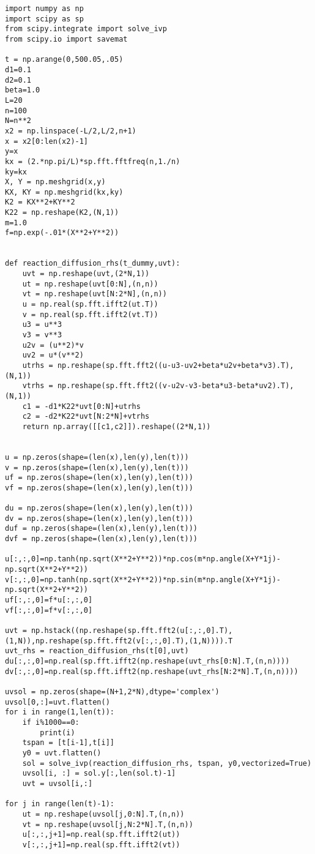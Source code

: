 \documentclass[12pt]{article}
\begin{document}
\begin{verbatim}
import numpy as np
import scipy as sp
from scipy.integrate import solve_ivp
from scipy.io import savemat

t = np.arange(0,500.05,.05)
d1=0.1
d2=0.1
beta=1.0
L=20
n=100
N=n**2
x2 = np.linspace(-L/2,L/2,n+1)
x = x2[0:len(x2)-1]
y=x
kx = (2.*np.pi/L)*sp.fft.fftfreq(n,1./n)
ky=kx
X, Y = np.meshgrid(x,y)
KX, KY = np.meshgrid(kx,ky)
K2 = KX**2+KY**2
K22 = np.reshape(K2,(N,1))
m=1.0
f=np.exp(-.01*(X**2+Y**2))


def reaction_diffusion_rhs(t_dummy,uvt):
    uvt = np.reshape(uvt,(2*N,1))
    ut = np.reshape(uvt[0:N],(n,n))
    vt = np.reshape(uvt[N:2*N],(n,n))
    u = np.real(sp.fft.ifft2(ut.T))
    v = np.real(sp.fft.ifft2(vt.T))
    u3 = u**3
    v3 = v**3
    u2v = (u**2)*v
    uv2 = u*(v**2)
    utrhs = np.reshape(sp.fft.fft2((u-u3-uv2+beta*u2v+beta*v3).T),(N,1))
    vtrhs = np.reshape(sp.fft.fft2((v-u2v-v3-beta*u3-beta*uv2).T),(N,1))
    c1 = -d1*K22*uvt[0:N]+utrhs
    c2 = -d2*K22*uvt[N:2*N]+vtrhs
    return np.array([[c1,c2]]).reshape((2*N,1))


u = np.zeros(shape=(len(x),len(y),len(t)))
v = np.zeros(shape=(len(x),len(y),len(t)))
uf = np.zeros(shape=(len(x),len(y),len(t)))
vf = np.zeros(shape=(len(x),len(y),len(t)))

du = np.zeros(shape=(len(x),len(y),len(t)))
dv = np.zeros(shape=(len(x),len(y),len(t)))
duf = np.zeros(shape=(len(x),len(y),len(t)))
dvf = np.zeros(shape=(len(x),len(y),len(t)))

u[:,:,0]=np.tanh(np.sqrt(X**2+Y**2))*np.cos(m*np.angle(X+Y*1j)-np.sqrt(X**2+Y**2))
v[:,:,0]=np.tanh(np.sqrt(X**2+Y**2))*np.sin(m*np.angle(X+Y*1j)-np.sqrt(X**2+Y**2))
uf[:,:,0]=f*u[:,:,0]
vf[:,:,0]=f*v[:,:,0]

uvt = np.hstack((np.reshape(sp.fft.fft2(u[:,:,0].T),(1,N)),np.reshape(sp.fft.fft2(v[:,:,0].T),(1,N)))).T
uvt_rhs = reaction_diffusion_rhs(t[0],uvt)
du[:,:,0]=np.real(sp.fft.ifft2(np.reshape(uvt_rhs[0:N].T,(n,n))))
dv[:,:,0]=np.real(sp.fft.ifft2(np.reshape(uvt_rhs[N:2*N].T,(n,n))))

uvsol = np.zeros(shape=(N+1,2*N),dtype='complex')
uvsol[0,:]=uvt.flatten()
for i in range(1,len(t)):
    if i%1000==0:
        print(i)
    tspan = [t[i-1],t[i]]
    y0 = uvt.flatten()
    sol = solve_ivp(reaction_diffusion_rhs, tspan, y0,vectorized=True)
    uvsol[i, :] = sol.y[:,len(sol.t)-1]
    uvt = uvsol[i,:]

for j in range(len(t)-1):
    ut = np.reshape(uvsol[j,0:N].T,(n,n))
    vt = np.reshape(uvsol[j,N:2*N].T,(n,n))
    u[:,:,j+1]=np.real(sp.fft.ifft2(ut))
    v[:,:,j+1]=np.real(sp.fft.ifft2(vt))


\end{verbatim}
\end{document}
